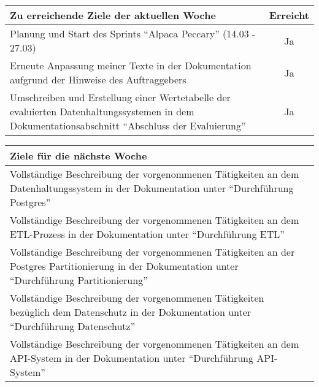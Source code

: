 \begin{tabularx}{\textwidth}{Xc}
    \arrayrulecolor{OliveGreen}
    \toprule
    {\bfseries Zu erreichende Ziele der aktuellen Woche} & {\bfseries Erreicht} \\
    \midrule[2pt]
    Planung und Start des Sprints ``Alpaca Peccary'' (14.03 - 27.03)  &  Ja  \\
    \rowcolor{OliveGreen!15}
    Erneute Anpassung meiner Texte in der Dokumentation aufgrund der Hinweise
    des Auftraggebers  &  Ja  \\
    \rowcolor{White}
    Umschreiben und Erstellung einer Wertetabelle der evaluierten
    Datenhaltungssystemen in dem Dokumentationsabschnitt
    ``Abschluss der Evaluierung''  &  Ja  \\
    \bottomrule[2pt]
\end{tabularx}
%
\vspace{1cm}
%
\begin{tabularx}{\textwidth}{Xc}
    \arrayrulecolor{OliveGreen}
    \toprule
    {\bfseries Ziele für die nächste Woche}              &                   \\
    \midrule[2pt]
    Vollständige Beschreibung der vorgenommenen Tätigkeiten an dem
    Datenhaltungssystem in der Dokumentation unter
    ``Durchführung Postgres''  &  \\
    \rowcolor{OliveGreen!15}
    Vollständige Beschreibung der vorgenommenen Tätigkeiten an dem
    ETL-Prozess in der Dokumentation unter
    ``Durchführung ETL''  &  \\
    \rowcolor{White}
    Vollständige Beschreibung der vorgenommenen Tätigkeiten an der
    Postgres Partitionierung in der Dokumentation unter
    ``Durchführung Partitionierung''  &  \\
    \rowcolor{OliveGreen!15}
    Vollständige Beschreibung der vorgenommenen Tätigkeiten bezüglich dem
    Datenschutz in der Dokumentation unter
    ``Durchführung Datenschutz''  &  \\
    \rowcolor{White}
    Vollständige Beschreibung der vorgenommenen Tätigkeiten an dem
    API-System in der Dokumentation unter
    ``Durchführung API-System''  &  \\
\end{tabularx}
